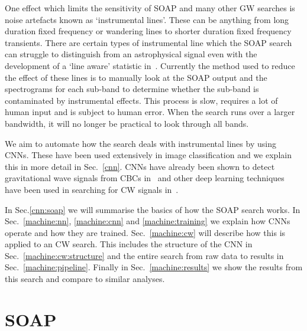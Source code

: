 %

One effect which limits the sensitivity of SOAP and many other
\gls{GW} searches is noise artefacts known as `instrumental lines'. These can be anything
from long duration fixed frequency or wandering lines to shorter duration fixed frequency transients. 
There are certain types of instrumental line which the SOAP search can struggle to distinguish from an astrophysical signal even with the development of a
`line aware' statistic in~\cite{bayley2019SOAPGeneralised}. Currently the
method used to reduce the effect of these lines is to manually look at the SOAP
output and the spectrograms for each sub-band to determine whether the sub-band
is contaminated by instrumental effects. This process is slow, requires a
lot of human input and is subject to human error. When the search runs over
a larger bandwidth, it will no longer be practical to look
through all bands. 

%

We aim to automate how the search deals with instrumental lines by using \glspl{CNN}.
These have been used extensively in image classification and we explain this in
more detail in Sec.~\ref{cnn}. \glspl{CNN}
have already been shown to detect gravitational wave signals from \glspl{CBC}
in~\cite{gabbard2018MatchingMatched,george2018DeepLearning,gebhard2019ConvolutionalNeural}
and other deep learning techniques have been used in searching for \gls{CW}
signals in~\cite{dreissigacker2019DeeplearningContinuous}. 

%
In Sec.\ref{cnn:soap} we will summarise the basics of how the SOAP search works. In
Sec.~\ref{machine:nn}, \ref{machine:cnn} and \ref{machine:training} we explain how \glspl{CNN} operate and how they are trained. Sec.~\ref{machine:cw} will describe how this is applied to an \gls{CW} search. 
This includes the structure of the \gls{CNN} in Sec.~\ref{machine:cw:structure} and the entire search from raw data to results in Sec.~\ref{machine:pipeline}. Finally in Sec.~\ref{machine:results} we
show the results from this search and compare to similar analyses. 

\section{\label{cnn:soap} SOAP}

